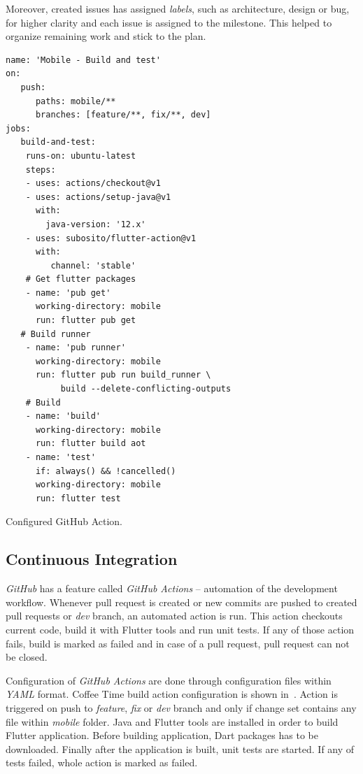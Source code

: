 Moreover, created issues has assigned \textit{labels}, such as architecture, design or bug, for higher clarity and each issue is assigned to the milestone. This helped to organize remaining work and stick to the plan. 

\begin{listing}[ht]
\begin{verbatim}
name: 'Mobile - Build and test'
on:
   push:
      paths: mobile/**
      branches: [feature/**, fix/**, dev]
jobs:
   build-and-test: 
    runs-on: ubuntu-latest
    steps:
    - uses: actions/checkout@v1 
    - uses: actions/setup-java@v1
      with:
        java-version: '12.x'
    - uses: subosito/flutter-action@v1
      with:
         channel: 'stable'
    # Get flutter packages
    - name: 'pub get'
      working-directory: mobile
      run: flutter pub get
   # Build runner
    - name: 'pub runner'
      working-directory: mobile
      run: flutter pub run build_runner \ 
           build --delete-conflicting-outputs
    # Build
    - name: 'build'
      working-directory: mobile
      run: flutter build aot
    - name: 'test'
      if: always() && !cancelled()
      working-directory: mobile
      run: flutter test
\end{verbatim}
\caption{Configured GitHub Action.}
\label{listing:gh-ci}
\end{listing}

\subsection{Continuous Integration}

\textit{GitHub} has a feature called \textit{GitHub Actions} -- automation of the development workflow. Whenever pull request is created or new commits are pushed to created pull requests or \textit{dev} branch, an automated action is run. This action checkouts current code, build it with Flutter tools and run unit tests. If any of those action fails, build is marked as failed and in case of a pull request, pull request can not be closed. 

Configuration of \textit{GitHub Actions} are done through configuration files within \textit{YAML} format. Coffee Time build action configuration is shown in~. Action is triggered on push to \textit{feature}, \textit{fix} or \textit{dev} branch and only if change set contains any file within \textit{mobile} folder. Java and Flutter tools are installed in order to build Flutter application. Before building application, Dart packages has to be downloaded. Finally after the application is built, unit tests are started. If any of tests failed, whole action is marked as failed.

